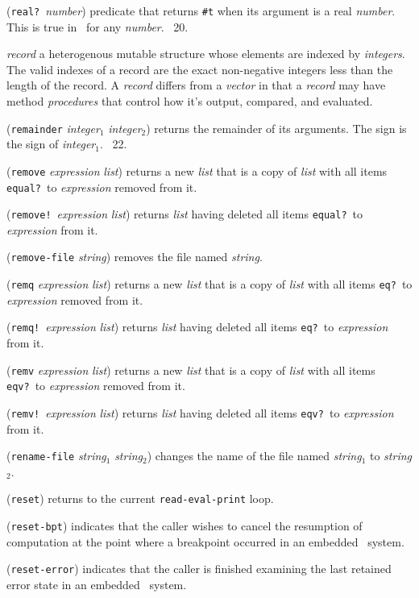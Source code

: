 \documentclass[10pt,twocolumn]{article}
\begin{document}
(\texttt{real?}\ \emph{number}) predicate that returns \texttt{\#t}
when its argument is a real \emph{number}.  This is true in \StoC\ for
any \emph{number}. \RRRRRS~20.

\emph{record} a heterogenous mutable structure whose elements are
indexed by \emph{integers}.  The valid indexes of a record are the
exact non-negative integers less than the length of the record. A
\emph{record} differs from a \emph{vector} in that a \emph{record} may
have method \emph{procedures} that control how it's output, compared,
and evaluated.

(\texttt{remainder} \emph{integer}$_1$ \emph{integer}$_2$) returns the
remainder of its arguments.  The sign is the sign of
\emph{integer}$_1$. \RRRRRS~22.

(\texttt{remove} \emph{expression} \emph{list}) returns a new
\emph{list} that is a copy of \emph{list} with all items
\texttt{equal?}\ to \emph{expression} removed from it.

(\texttt{remove!}\ \emph{expression} \emph{list}) returns \emph{list}
having deleted all items \texttt{equal?}\ to \emph{expression} from
it.

(\texttt{remove-file} \emph{string}) removes the file named
\emph{string}.

(\texttt{remq} \emph{expression} \emph{list}) returns a new
\emph{list} that is a copy of \emph{list} with all items
\texttt{eq?}\ to \emph{expression} removed from it.

(\texttt{remq!}\ \emph{expression} \emph{list}) returns \emph{list}
having deleted all items \texttt{eq?}\ to \emph{expression} from it.

(\texttt{remv} \emph{expression} \emph{list}) returns a new
\emph{list} that is a copy of \emph{list} with all items
\texttt{eqv?}\ to \emph{expression} removed from it.

(\texttt{remv!}\ \emph{expression} \emph{list}) returns \emph{list}
having deleted all items \texttt{eqv?}\ to \emph{expression} from it.

(\texttt{rename-file} \emph{string}$_1$ \emph{string}$_2$) changes the
name of the file named \emph{string}$_1$ to \emph{string}$_2$.

(\texttt{reset}) returns to the current \texttt{read-eval-print} loop.

(\texttt{reset-bpt}) indicates that the caller wishes to cancel the
resumption of computation at the point where a breakpoint occurred in
an embedded \StoC\ system.

(\texttt{reset-error}) indicates that the caller is finished examining
the last retained error state in an embedded \StoC\ system.
\end{document}
